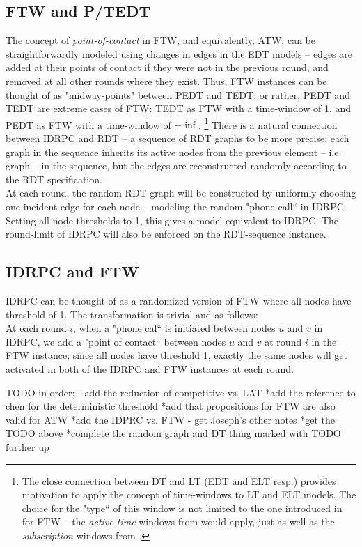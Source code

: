 \documentclass[twocolumn, 10pt]{article}
\begin{document}
\subsection{FTW and P/TEDT}
The concept of \textit{point-of-contact} in FTW, and equivalently, ATW, can be straightforwardly modeled using changes in edges in the EDT models -- edges are added at their points of contact if they were not in the previous round, and removed at all other rounds where they exist. Thus, FTW instances can be thought of as "midway-points" between PEDT and TEDT; or rather, PEDT and TEDT are extreme cases of FTW: TEDT as FTW with a time-window of 1, and PEDT as FTW with a time-window of $+\inf$. 
\footnote{The close connection between DT and LT (EDT and ELT resp.) provides motivation to apply the concept of time-windows to LT and ELT models. The choice for the "type`` of this window is not limited to the one introduced in \cite{karimi} for FTW -- the \textit{active-time} windows from \cite{gargano} would apply, just as well as the \textit{subscription} windows from \cite{vig}.}
There is a natural connection between IDRPC and RDT -- a sequence of RDT graphs to be more precise: each graph in the sequence inherits its active nodes from the previous element -- i.e. graph -- in the sequence, but the edges are reconstructed randomly according to the RDT specification. \\
At each round, the random RDT graph will be constructed by uniformly choosing one incident edge for each node -- modeling the random "phone call`` in IDRPC. Setting all node thresholds to 1, this gives a model equivalent to IDRPC. The round-limit of IDRPC will also be enforced on the RDT-sequence instance.
\subsection{IDRPC and FTW}
IDRPC can be thought of as a randomized version of FTW where all nodes have threshold of 1. The transformation is trivial and as follows: \\
At each round $i$, when a "phone cal`` is initiated between nodes $u$ and $v$ in IDRPC, we add a "point of contact`` between nodes $u$ and $v$ at round $i$ in the FTW instance; since all nodes have threshold 1, exactly the same nodes will get activated in both of the IDRPC and FTW instances at each round. 


TODO in order: 
- add the reduction of competitive vs. LAT
*add the reference to chen for the deterministic threshold
*add that propositions for FTW are also valid for ATW 
*add the IDPRC vs. FTW
- get Joseph's other notes 
*get the TODO above
*complete the random graph and DT thing marked with TODO further up
\end{document}
